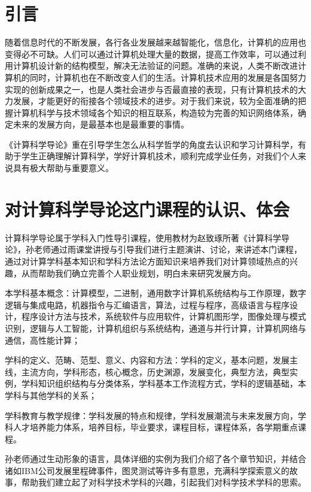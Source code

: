 \documentclass{article}
\begin{document}
\thispagestyle{empty}
\newpage
\setcounter{page}{1}
\section{引言}
随着信息时代的不断发展，各行各业发展越来越智能化，信息化，计算机的应用也变得必不可缺。人们可以通过计算机处理大量的数据，提高工作效率，可以通过利用计算机设计新的结构模型，解决无法验证的问题。准确的来说，人类不断改进计算机的同时，计算机也在不断改变人们的生活。计算机技术应用的发展是各国努力实现的创新成果之一，也是人类社会进步与否最直接的表现，只有计算机技术的大力发展，才能更好的衔接各个领域技术的进步。对于我们来说，较为全面准确的把握计算机科学与技术领域各个知识的相互联系，构造较为完善的知识网络体系，确定未来的发展方向，是最基本也是最重要的事情。\par
《计算科学导论》重在引导学生怎么从科学哲学的角度去认识和学习计算科学，有助于学生正确理解计算科学，学好计算机技术，顺利完成学业任务，对我们个人来说具有极大帮助与重要意义。

\section{对计算科学导论这门课程的认识、体会}
计算科学导论属于学科入门性导引课程，使用教材为赵致琢所著《计算科学导论》，孙老师通过雨课堂讲授与引导我们进行主题演讲、讨论，来讲述本门课程，通过对计算学科基本知识和学科方法论方面知识来培养我们对计算领域热点的兴趣，从而帮助我们确立完善个人职业规划，明白未来研究发展方向。\par
本学科基本概念：计算模型，二进制，通用数字计算机系统结构与工作原理，数字逻辑与集成电路，机器指令与汇编语言，算法，过程与程序，高级语言与程序设计，程序设计方法与技术，系统软件与应用软件，计算机图形学，图像处理与模式识别，逻辑与人工智能，计算机组织与系统结构，通道与并行计算，计算机网络与通信，高性能计算；\par
学科的定义、范畴、范型、意义、内容和方法：学科的定义，基本问题，发展主线，主流方向，学科形态，核心概念，历史渊源，发展变化，典型方法，典型实例，学科知识组织结构与分类体系，学科基本工作流程方式，学科的逻辑基础，本学科与其他学科的关系；\par
学科教育与教学规律：学科发展的特点和规律，学科发展潮流与未来发展方向，学科人才培养能力体系，培养目标，毕业要求，课程目标，课程体系，各学期重点课程。\par
孙老师通过生动形象的语言，具体详细的实例为我们介绍了各个章节知识，并结合诸如IBM公司发展里程碑事件，图灵测试等许多有意思，充满科学探索意义的故事，帮助我们建\cite{he1}立起了对科学技术学科的兴趣，引起我们对科学技术学科的思索。\par
\end{document}
